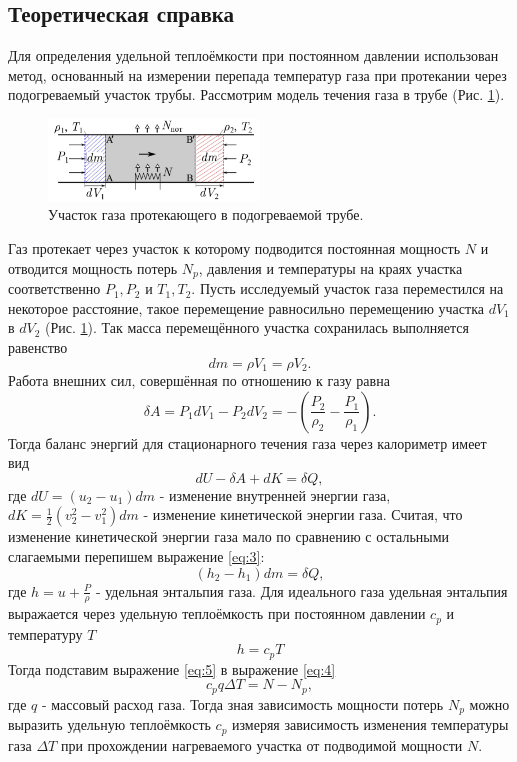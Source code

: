 \documentclass[12pt]{article}
\begin{document}
\subsection{Теоретическая справка}
Для определения удельной теплоёмкости при постоянном давлении использован
метод, основанный на измерении перепада температур газа при протекании через 
подогреваемый участок трубы. Рассмотрим модель течения газа в трубе (Рис. \ref{fig:pic}).
\begin{figure}[H]
    \centering
    \includegraphics[width=0.5\textwidth]{pic.png}
    \caption{Участок газа протекающего в подогреваемой трубе. }
    \label{fig:pic}
\end{figure}
Газ протекает через участок к которому подводится постоянная мощность $N$ и отводится 
мощность потерь $N_p$, давления и температуры на краях участка соответственно $P_1, P_2$ и $T_1, T_2$.
Пусть исследуемый участок газа переместился на некоторое расстояние, такое перемещение равносильно 
перемещению участка $d V_1$ в $d V_2$ (Рис. \ref{fig:pic}). Так масса перемещённого участка сохранилась выполняется равенство 
\begin{equation}
    d m = \rho V_1 = \rho V_2.
    \label{eq:1}
\end{equation}
Работа внешних сил, совершённая по отношению к газу равна 
\begin{equation}
    \delta A = P_1 d V_1 - P_2 d V_2 = -\left( \frac{P_2}{\rho_2} - \frac{P_1}{\rho_1} \right) .
    \label{eq:2}
\end{equation}
Тогда баланс энергий для стационарного течения газа через калориметр имеет вид 
\begin{equation}
    d U - \delta A + d K = \delta Q,
    \label{eq:3}
\end{equation}
где $dU = (u_2 - u_1) dm$ - изменение внутренней энергии газа, $d K = \frac{1}{2} (v_2^2 - v_1^2) dm$ - изменение кинетической энергии газа.
Считая, что изменение кинетической энергии газа мало по сравнению с остальными слагаемыми перепишем выражение \ref{eq:3}: 
\begin{equation}
    (h_2 - h_1) dm = \delta Q,
    \label{eq:4}
\end{equation}
где $h = u + \frac{P}{\rho}$ - удельная энтальпия газа. 
Для идеального газа удельная энтальпия выражается через удельную теплоёмкость при постоянном давлении $c_p$ и температуру $T$
\begin{equation}
    h = c_p T
    \label{eq:5}
\end{equation}
Тогда подставим выражение \ref{eq:5} в выражение \ref{eq:4}
\begin{equation}
    c_p q \Delta T = N - N_p,
    \label{eq:6}
\end{equation}
где $q$ - массовый расход газа. Тогда зная зависимость мощности потерь $N_p$ можно выразить удельную 
теплоёмкость $c_p$ измеряя зависимость изменения температуры газа $\Delta T$ при прохождении нагреваемого участка от подводимой мощности $N$.     
\end{document}
